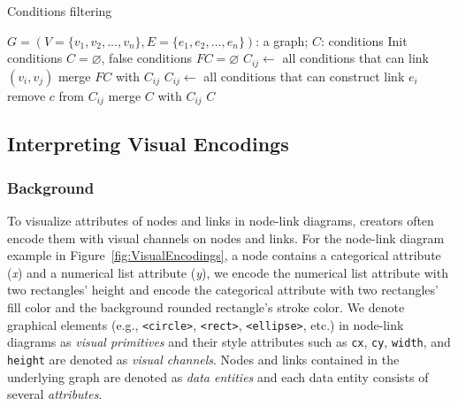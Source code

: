 \begin{algorithm}[!t]
    \renewcommand\arraystretch{1.2}
    \caption{ Conditions filtering }
    \label{alg:conditions}
    \begin{algorithmic}[1]
        \Require
            $G=(V=\{v_1, v_2, ..., v_n\}, E=\{e_1, e_2, ..., e_n\})$: a graph;
        \Ensure
            $C$: conditions
        \State Init conditions $C=\varnothing$, false conditions $FC=\varnothing$
                \State $C_{ij} \gets$ all conditions that can link $(v_i, v_j)$
                \State merge $FC$ with $C_{ij}$
            \EndIf
        \EndFor
            \State $C_{ij} \gets$ all conditions that can construct link $e_i$
                    \State remove $c$ from $C_{ij}$
                \EndIf
            \EndFor
            \State merge $C$ with $C_{ij}$
        \EndFor
        \State \Return $C$
    \end{algorithmic}
\end{algorithm}


\subsection{Interpreting Visual Encodings}\label{sec:visualencodings}
\subsubsection{Background}
To visualize attributes of nodes and links in node-link diagrams, creators often encode them with visual channels on nodes and links.
For the node-link diagram example in Figure~\ref{fig:VisualEncodings}, a node contains a categorical attribute (\textit{x}) and a numerical list attribute (\textit{y}), we encode the numerical list attribute with two rectangles' height and encode the categorical attribute with two rectangles' fill color and the background rounded rectangle's stroke color.
We denote graphical elements (e.g., \texttt{<circle>}, \texttt{<rect>}, \texttt{<ellipse>}, etc.) in node-link diagrams as \textit{visual primitives} and their style attributes such as \texttt{cx}, \texttt{cy}, \texttt{width}, and \texttt{height} are denoted as \textit{visual channels}.
Nodes and links contained in the underlying graph are denoted as \textit{data entities} and each data entity consists of several \textit{attributes}.

